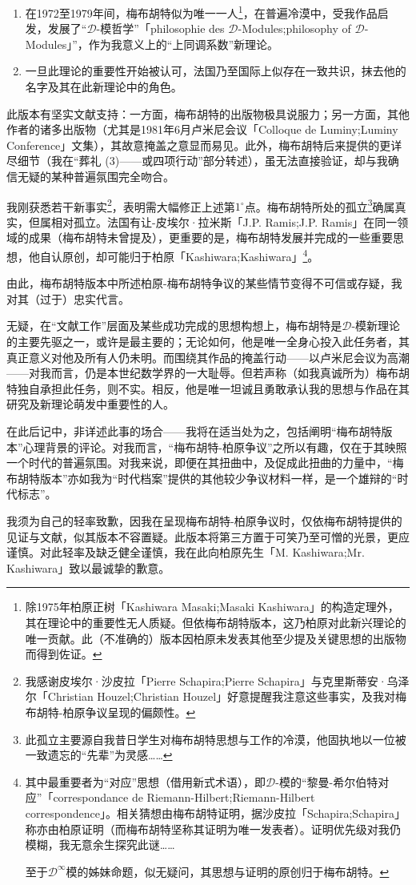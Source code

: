 \begin{enumerate}
    \item 在1972至1979年间，梅布胡特似为唯一一人\footnote{除1975年柏原正树「Kashiwara Masaki;Masaki Kashiwara」的构造定理外，其在理论中的重要性无人质疑。但依梅布胡特版本，这乃柏原对此新兴理论的唯一贡献。此（不准确的）版本因柏原未发表其他至少提及关键思想的出版物而得到佐证。}，在普遍冷漠中，受我作品启发，发展了“$\mathscr{D}$-模哲学”「philosophie des $\mathscr{D}$-Modules;philosophy of $\mathscr{D}$-Modules」”，作为我意义上的“上同调系数”新理论。
    \item 一旦此理论的重要性开始被认可，法国乃至国际上似存在一致共识，抹去他的名字及其在此新理论中的角色。
\end{enumerate}

此版本有坚实文献支持：一方面，梅布胡特的出版物极具说服力；另一方面，其他作者的诸多出版物（尤其是1981年6月卢米尼会议「Colloque de Luminy;Luminy Conference」文集），其故意掩盖之意显而易见。此外，梅布胡特后来提供的更详尽细节（我在“葬礼 (3)——或四项行动”部分转述），虽无法直接验证，却与我确信无疑的某种普遍氛围完全吻合。

我刚获悉若干新事实\footnote{我感谢皮埃尔·沙皮拉「Pierre Schapira;Pierre Schapira」与克里斯蒂安·乌泽尔「Christian Houzel;Christian Houzel」好意提醒我注意这些事实，及我对梅布胡特-柏原争议呈现的偏颇性。}，表明需大幅修正上述第$1^{\circ}$点。梅布胡特所处的孤立\footnote{此孤立主要源自我昔日学生对梅布胡特思想与工作的冷漠，他固执地以一位被一致遗忘的“先辈”为灵感……}确属真实，但属相对孤立。法国有让-皮埃尔·拉米斯「J.P. Ramis;J.P. Ramis」在同一领域的成果（梅布胡特未曾提及），更重要的是，梅布胡特发展并完成的一些重要思想，他自认原创，却可能归于柏原「Kashiwara;Kashiwara」\footnote{其中最重要者为“对应”思想（借用新式术语），即$\mathscr{D}$-模的“黎曼-希尔伯特对应”「correspondance de Riemann-Hilbert;Riemann-Hilbert correspondence」。相关猜想由梅布胡特证明，据沙皮拉「Schapira;Schapira」称亦由柏原证明（而梅布胡特坚称其证明为唯一发表者）。证明优先级对我仍模糊，我无意余生探究此谜……

至于$\mathscr{D}^{\infty}$模的姊妹命题，似无疑问，其思想与证明的原创归于梅布胡特。}。

由此，梅布胡特版本中所述柏原-梅布胡特争议的某些情节变得不可信或存疑，我对其（过于）忠实代言。

无疑，在“文献工作”层面及某些成功完成的思想构想上，梅布胡特是$\mathscr{D}$-模新理论的主要先驱之一，或许是最主要的；无论如何，他是唯一全身心投入此任务者，其真正意义对他及所有人仍未明。而围绕其作品的掩盖行动——以卢米尼会议为高潮——对我而言，仍是本世纪数学界的一大耻辱。但若声称（如我真诚所为）梅布胡特独自承担此任务，则不实。相反，他是唯一坦诚且勇敢承认我的思想与作品在其研究及新理论萌发中重要性的人。

在此后记中，非详述此事的场合——我将在适当处为之，包括阐明“梅布胡特版本”心理背景的评论。对我而言，“梅布胡特-柏原争议”之所以有趣，仅在于其映照一个时代的普遍氛围。对我来说，即便在其扭曲中，及促成此扭曲的力量中，“梅布胡特版本”亦如我为“时代档案”提供的其他较少争议材料一样，是一个雄辩的“时代标志”。

我须为自己的轻率致歉，因我在呈现梅布胡特-柏原争议时，仅依梅布胡特提供的见证与文献，似其版本不容置疑。此版本将第三方置于可笑乃至可憎的光景，更应谨慎。对此轻率及缺乏健全谨慎，我在此向柏原先生「M. Kashiwara;Mr. Kashiwara」致以最诚挚的歉意。